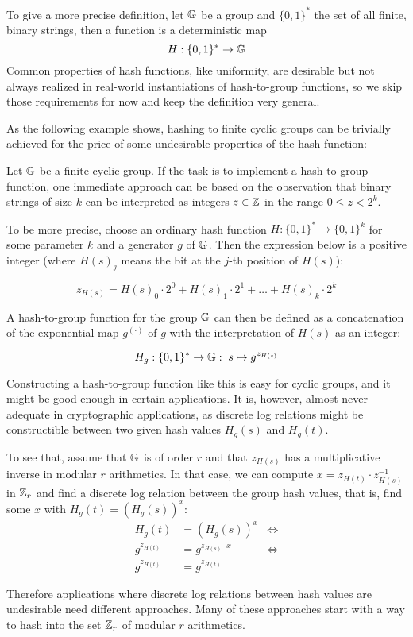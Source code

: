 To give a more precise definition, let $\mathbb{G}$ be a group and $\{0,1\}^*$ the set of all finite, binary strings, then a  function is a deterministic map
\begin{equation}
H : \{0,1\}^* \to \mathbb{G}
\end{equation}
Common properties of hash functions, like uniformity, are desirable but not always realized in real-world instantiations of hash-to-group functions, so we skip those requirements for now and keep the definition very general.

As the following example shows, hashing to finite cyclic groups can be trivially achieved for the price of some undesirable properties of the hash function:
\begin{example}\label{integers-binary-repr} Let $\mathbb{G}$ be a finite cyclic group. If the task is to implement a hash-to-group function, one immediate approach can be based on the observation that binary strings of size $k$ can be interpreted as integers $z\in\mathbb{Z}$ in the range $0\leq z < 2^k$.

To be more precise, choose an ordinary hash function $H:\{0,1\}^*\to \{0,1\}^k$ for some parameter $k$ and a generator $g$ of $\mathbb{G}$. Then the expression below is a positive integer (where $H(s)_j$ means the bit at the $j$-th position of $H(s)$):

\begin{equation}
z_{H(s)}= H(s)_0\cdot 2^0 + H(s)_1\cdot 2^1 + \ldots + H(s)_k \cdot 2^k
\end{equation}

A hash-to-group function for the group $\mathbb{G}$ can then be defined as a concatenation of the exponential map $g^{(\cdot)}$ of $g$ with the interpretation of $H(s)$ as an integer:

\begin{equation}
H_{g} : \{0,1\}^* \to \mathbb{G}:\; s \mapsto g^{z_{H(s)}}
\end{equation}

Constructing a hash-to-group function like this is easy for cyclic groups, and it might be good enough in certain applications. It is, however, almost never adequate in cryptographic applications, as discrete log relations might be constructible between two given hash values $H_g(s)$ and $H_g(t)$.

To see that, assume that $\mathbb{G}$ is of order $r$ and that $z_{H(s)}$ has a multiplicative inverse in modular $r$ arithmetics. In that case, we can compute $x=z_{H(t)}\cdot z_{H(s)}^{-1}$ in $\mathbb{Z}_r$ and  find a discrete log relation between the group hash values, that is, find some $x$ with $H_g(t) = (H_g(s))^x$:
\begin{align*}
H_g(t) & = (H_g(s))^x & \Leftrightarrow \\
g^{z_{H(t)}} & = g^{z_{H(s)}\cdot x} & \Leftrightarrow \\
g^{z_{H(t)}} & = g^{z_{H(t)}}
\end{align*}
\end{example}
Therefore applications where discrete log relations between hash values are undesirable need different approaches. Many of these approaches start with a way to hash into the set $\mathbb{Z}_r$ of modular $r$ arithmetics.
